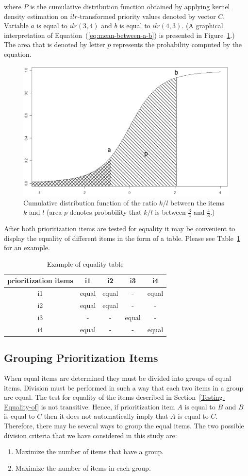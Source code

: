 where $P$ is the cumulative distribution function obtained by applying kernel density estimation on $ilr$-transformed priority values denoted by vector $C$. Variable $a$ is equal to $ilr(3,4)$ and $b$ is equal to $ilr(4,3)$. (A graphical interpretation of Equation~(\ref{eq:mean-between-a-b}) is presented in Figure~\ref{fig:Probability-p-that}.)
The area that is denoted by letter $p$ represents the probability computed by the equation.

\begin{figure}
	\center
\includegraphics[scale=0.2]{fig/p}
\caption{
	\label{fig:Probability-p-that}
	Cumulative distribution function of the ratio $k/l$ between the items $k$ and $l$ (area $p$ denotes probability that $k/l$ is between $\frac{3}{4}$ and $\frac{4}{3}$.)
}
\end{figure}

After both prioritization items are tested for equality it may
be convenient to display the equality of different items in the form of a table.
Please see Table~\ref{tab:ECVexample} for an example.

\begin{table}
	\scriptsize
	\centering
\caption{Example of equality table}

\label{tab:ECVexample}
\begin{tabular}{|c|c|c|c|c|}
\hline 
prioritization items & i1 & i2 & i3 & i4\tabularnewline
\hline\hline 
i1 & equal & equal & - & equal\tabularnewline
\hline 
i2 & equal & equal & - & -\tabularnewline
\hline 
i3 & - & - & equal & -\tabularnewline
\hline 
i4 & equal & - & - & equal\tabularnewline
\hline
\end{tabular}
\end{table}

\subsection{Grouping Prioritization Items}
When equal items are determined they must be divided into groups of equal items. Division must be performed in such a way that each two items in a group are equal. The test for equality of the items described in Section~\ref{Testing-Equality-of} is not transitive. Hence, if prioritization item $A$ is equal to $B$ and $B$ is equal to $C$ then it does not automatically imply that $A$ is equal to $C$. Therefore, there may be several ways to group the equal items. The two possible division criteria that we have considered in this study are:

\begin{enumerate}
\item Maximize the number of items that have a group.
\item Maximize the number of items in each group.
\end{enumerate}
